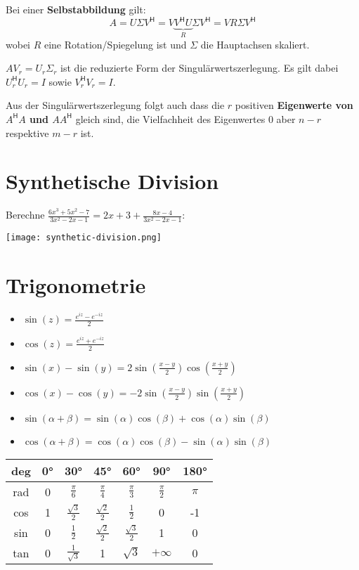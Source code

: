\documentclass[a4paper,10pt]{article}
\newcommand*{\hermconj}{\mathsf{H}}
\begin{document}
Bei einer \textbf{Selbstabbildung} gilt:
$$A = U \Sigma V^\hermconj = V \underbrace{V^\hermconj U}_R \Sigma V^\hermconj = V R \Sigma V^\hermconj$$
wobei $R$ eine Rotation/Spiegelung ist und $\Sigma$ die Hauptachsen skaliert.

$A V_r = U_r \Sigma_r$ ist die reduzierte Form der Singulärwertszerlegung. Es gilt dabei $U_r^\hermconj U_r = I$ sowie $V_r^\hermconj V_r = I$.

Aus der Singulärwertszerlegung folgt auch dass die $r$ positiven \textbf{Eigenwerte von $A^\hermconj A$ und $AA^\hermconj$} gleich sind, die Vielfachheit des Eigenwertes $0$ aber $n-r$ respektive $m-r$ ist.

\section{Synthetische Division}
Berechne $\frac{6x^3 + 5x^2 - 7}{3x^2 - 2x - 1} = 2x + 3 + \frac{8x - 4}{3x^2 -2x - 1}$:\\
\begin{center}
  \texttt{[image: synthetic-division.png]}
\end{center}

\section{Trigonometrie}

\begin{itemize}
  \item $\sin(z) = \frac{e^{iz} - e^{-iz}}{2}$
  \item $\cos(z) = \frac{e^{iz} + e^{-iz}}{2}$
  \item $\sin(x) - \sin(y) = 2\sin(\frac{x - y}{2})\cos(\frac{x + y}{2})$
  \item $\cos(x) - \cos(y) = -2\sin(\frac{x - y}{2})\sin(\frac{x + y}{2})$
  \item $\sin(\alpha + \beta) = \sin(\alpha) \cos(\beta) + \cos(\alpha) \sin(\beta)$
  \item $\cos(\alpha + \beta) = \cos(\alpha) \cos(\beta) - \sin(\alpha) \sin(\beta)$
\end{itemize}

\begin{mainbox}{}
  \begin{center} 
   \begin{tabular}{c|cccccc}
    deg & 0° & 30° & 45° & 60° & 90° & 180° \\
    \midrule
    rad & 0 & $\frac{\pi}{6}$ & $\frac{\pi}{4}$ & $\frac{\pi}{3}$ & $\frac{\pi}{2}$ & $\pi$ \\
    cos & 1 & $\frac{\sqrt{3}}{2}$ & $\frac{\sqrt{2}}{2}$ & $\frac{1}{2}$ & 0 & -1 \\
    sin & 0 & $\frac{1}{2}$ & $\frac{\sqrt{2}}{2}$ & $\frac{\sqrt{3}}{2}$ & 1 & 0 \\
    tan & 0 & $\frac{1}{\sqrt{3}}$ & 1 & $\sqrt{3}$ & $+\infty$ & 0 \\
   \end{tabular}
  \end{center}
\end{mainbox}
\end{document}
